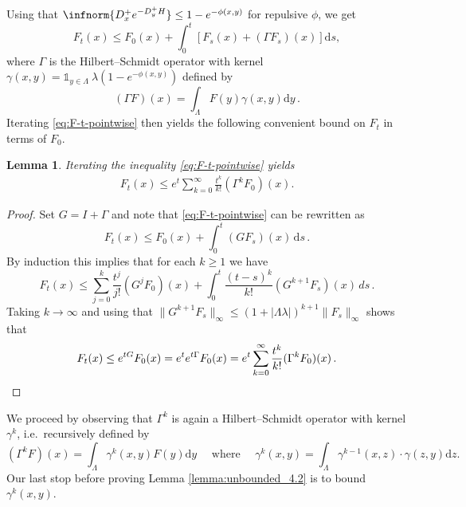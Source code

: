 \documentclass[10pt]{amsart}
\newtheorem{lemma}[theorem]{Lemma}
\theoremstyle{definition}
\theoremstyle{remark}
\newcommand{\ind}[1]{\mathds{1}_{#1}}
\newcommand{\region}{\Lambda}
\newcommand{\potential}{\phi}
\newcommand{\activity}{\lambda}
\newcommand{\diff}{\mathrm{d}}
\begin{document}
	
	Using that $\infnorm{D_x^+ e^{- D_y^+ H}} \le 1 - e^{- \potential(x, y)}$ for repulsive $\potential$, we get
	\begin{equation}\label{eq:F-t-pointwise}
		F_t(x) \le F_0(x) + \int_{0}^{t} \left[F_s(x) + (\Gamma F_s)(x) \right] \diff s ,
	\end{equation}
	where $\Gamma$ is the Hilbert--Schmidt operator with kernel $\gamma(x, y) = \ind{y \in \region} \ \activity  (1 - e^{-\potential(x, y)})$ defined by \begin{equation*}
		(\Gamma F)(x) = \int_{\Lambda} F(y) \gamma(x,y) \diff y\,.
	\end{equation*}
	Iterating \eqref{eq:F-t-pointwise} then yields the following convenient bound on $F_t$ in terms of $F_0$.
	\begin{lemma}
		Iterating the inequality \eqref{eq:F-t-pointwise} yields
		\begin{align} \label{eq:ft_bound}
			F_t(x) \le e^{t} \sum_{k=0}^{\infty} \frac{t^k}{k!} (\Gamma^k F_0)(x) .
		\end{align}  
	\end{lemma}
	\begin{proof}
		Set $G = I + \Gamma$ and note that \eqref{eq:F-t-pointwise} can be rewritten as $$F_t(x) \leq F_0(x) + \int_0^t (G F_s)(x)\, \diff s\,.$$  By induction this implies that for each $k \geq 1$ we have \begin{equation*}
			F_t(x) \leq \sum_{j = 0}^k \frac{t^j}{j!} (G^j F_0)(x) + \int_0^t \frac{(t - s)^k}{k!} (G^{k+1} F_s)(x) \,ds\,.
		\end{equation*}
		Taking $k \to \infty$ and using that $\|G^{k+1} F_s \|_\infty \leq (1 + |\Lambda \lambda|)^{k+1}  \|F_s\|_\infty$ shows that \begin{equation*} F_t(x) \leq  e^{t G} F_0(x) = e^{t} e^{t\Gamma}F_0(x) = e^{t} \sum_{k = 0}^\infty \frac{t^k}{k!} (\Gamma^k F_0)(x)\,. \qedhere \end{equation*}
	\end{proof}
	
	We proceed by observing that $\Gamma^k$ is again a Hilbert--Schmidt operator with kernel $\gamma^k$, i.e.\  recursively defined by
	\[
	(\Gamma^k F)(x) = \int_{\region} \gamma^{k}(x,y) F(y) \diff y \quad \text{ where } \quad 
	\gamma^k(x, y) = \int_{\region} \gamma^{k-1}(x, z) \cdot \gamma(z, y) \diff z .
	\]
	Our last stop before proving Lemma \ref{lemma:unbounded_4.2} is to bound $\gamma^k(x, y)$.
	
\end{document}
